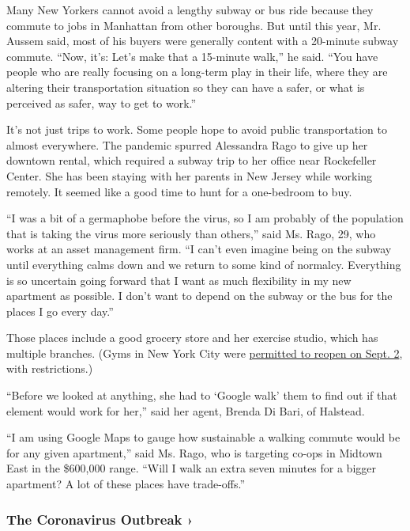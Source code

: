 Many New Yorkers cannot avoid a lengthy subway or bus ride because they
commute to jobs in Manhattan from other boroughs. But until this year,
Mr. Aussem said, most of his buyers were generally content with a
20-minute subway commute. ``Now, it's: Let's make that a 15-minute
walk,'' he said. ``You have people who are really focusing on a
long-term play in their life, where they are altering their
transportation situation so they can have a safer, or what is perceived
as safer, way to get to work.''

It's not just trips to work. Some people hope to avoid public
transportation to almost everywhere. The pandemic spurred Alessandra
Rago to give up her downtown rental, which required a subway trip to her
office near Rockefeller Center. She has been staying with her parents in
New Jersey while working remotely. It seemed like a good time to hunt
for a one-bedroom to buy.

``I was a bit of a germaphobe before the virus, so I am probably of the
population that is taking the virus more seriously than others,'' said
Ms. Rago, 29, who works at an asset management firm. ``I can't even
imagine being on the subway until everything calms down and we return to
some kind of normalcy. Everything is so uncertain going forward that I
want as much flexibility in my new apartment as possible. I don't want
to depend on the subway or the bus for the places I go every day.''

Those places include a good grocery store and her exercise studio, which
has multiple branches. (Gyms in New York City were
\href{https://www.nytimes3xbfgragh.onion/2020/08/17/nyregion/nyc-gyms-reopening.html}{permitted
to reopen on Sept. 2}, with restrictions.)

``Before we looked at anything, she had to `Google walk' them to find
out if that element would work for her,'' said her agent, Brenda Di
Bari, of Halstead.

``I am using Google Maps to gauge how sustainable a walking commute
would be for any given apartment,'' said Ms. Rago, who is targeting
co-ops in Midtown East in the \$600,000 range. ``Will I walk an extra
seven minutes for a bigger apartment? A lot of these places have
trade-offs.''

\href{https://www.nytimes3xbfgragh.onion/news-event/coronavirus?action=click\&pgtype=Article\&state=default\&region=MAIN_CONTENT_3\&context=storylines_faq}{}

\hypertarget{the-coronavirus-outbreak-}{%
\subsubsection{The Coronavirus Outbreak
›}\label{the-coronavirus-outbreak-}}

